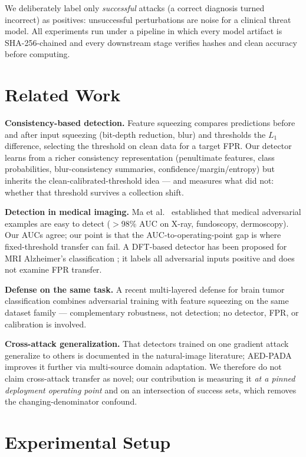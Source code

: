 \documentclass[runningheads]{llncs}
\begin{document}
We deliberately label only \emph{successful} attacks (a correct
diagnosis turned incorrect) as positives: unsuccessful perturbations are
noise for a clinical threat model. All experiments run under a pipeline
in which every model artifact is SHA-256-chained and every downstream
stage verifies hashes and clean accuracy before computing.

\section{Related Work}

\textbf{Consistency-based detection.} Feature squeezing
\cite{xu2018squeezing} compares predictions before and after input
squeezing (bit-depth reduction, blur) and thresholds the $L_1$
difference, selecting the threshold on clean data for a target FPR. Our
detector learns from a richer consistency representation (penultimate
features, class probabilities, blur-consistency summaries,
confidence/margin/entropy) but inherits the clean-calibrated-threshold
idea --- and measures what \cite{xu2018squeezing} did not: whether that
threshold survives a collection shift.

\textbf{Detection in medical imaging.} Ma et al.\
\cite{ma2021understanding} established that medical adversarial examples
are easy to detect ($>$98\% AUC on X-ray, fundoscopy, dermoscopy). Our
AUCs agree; our point is that the AUC-to-operating-point gap is where
fixed-threshold transfer can fail. A DFT-based detector has been proposed for MRI
Alzheimer's classification \cite{dftmri2024}; it labels all adversarial
inputs positive and does not examine FPR transfer.

\textbf{Defense on the same task.} A recent multi-layered defense for
brain tumor classification \cite{scireports2025braintumor} combines
adversarial training with feature squeezing on the same dataset family
--- complementary robustness, not detection; no detector, FPR, or
calibration is involved.

\textbf{Cross-attack generalization.} That detectors trained on one
gradient attack generalize to others is documented in the natural-image
literature; AED-PADA \cite{aedpada2024} improves it further via
multi-source domain adaptation. We therefore do not claim cross-attack
transfer as novel; our contribution is measuring it \emph{at a pinned
deployment operating point} and on an intersection of success sets,
which removes the changing-denominator confound.

\section{Experimental Setup}
\end{document}
